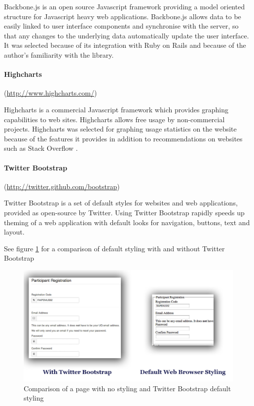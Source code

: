 Backbone.js is an open source Javascript framework providing a model oriented structure
for Javascript heavy web applications. Backbone.js allows data to be easily linked
to user interface components and synchronise with the server, so that any changes
to the underlying data automatically update the user interface. 
It was selected because of its integration with Ruby on Rails and because of the
author's familiarity with the library.

\paragraph{Highcharts}
(\url{http://www.highcharts.com/})

Highcharts is a commercial Javascript framework which provides graphing capabilities to web sites. Highcharts
allows free usage by non-commercial projects. Highcharts was selected for graphing usage statistics
on the website because of the features it provides in addition to recommendations on websites such as Stack Overflow \cite{stackoverflow_highcharts_2012}.

\paragraph{Twitter Bootstrap}
(\url{http://twitter.github.com/bootstrap})

Twitter Bootstrap is a set of default styles for websites and web applications,
provided as open-source by Twitter. Using Twitter Bootstrap rapidly speeds up theming of
a web application with default looks for navigation, buttons, text and layout.


See figure \ref{twitterbootstrap} for a comparison of default styling with and without Twitter Bootstrap
\begin{figure}[h!]
\includegraphics[width=120mm]{img/twitterbootstrap.jpg}
\caption{Comparison of a page with no styling and Twitter Bootstrap default styling}
\label{twitterbootstrap}
\end{figure}

